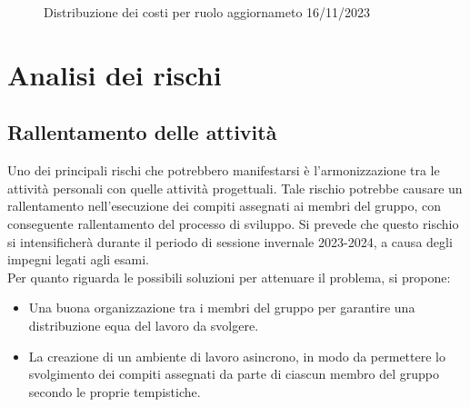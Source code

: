 \documentclass{article}
\begin{document}
\begin{figure}[h]
    \centering
    \caption{Distribuzione dei costi per ruolo aggiornameto 16/11/2023}
\end{figure}

\section{Analisi dei rischi}
\subsection{Rallentamento delle attività}
Uno dei principali rischi che potrebbero manifestarsi è l'armonizzazione tra le attività personali con quelle attività progettuali. Tale rischio
potrebbe causare un rallentamento nell'esecuzione dei compiti assegnati ai membri del gruppo, con conseguente rallentamento del processo di sviluppo.
Si prevede che questo rischio si intensificherà durante il periodo di sessione invernale 2023-2024, a causa degli impegni legati agli esami.\\
Per quanto riguarda le possibili soluzioni per attenuare il problema, si propone:

\begin{itemize}
    \item Una buona organizzazione tra i membri del gruppo per garantire una distribuzione equa del lavoro da svolgere.
    \item La creazione di un ambiente di lavoro asincrono, in modo da permettere lo svolgimento dei compiti assegnati da parte di ciascun membro del gruppo secondo le proprie tempistiche.
\end{itemize}
\end{document}
